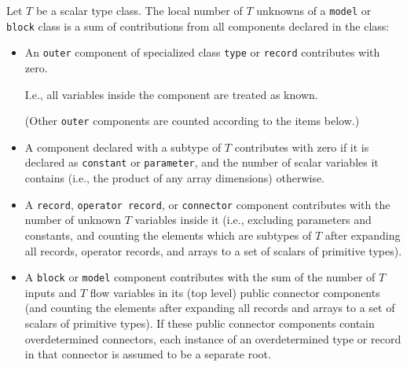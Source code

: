 \begin{definition}
Let $T$ be a scalar type class.
The local number of $T$ unknowns of a \lstinline!model! or \lstinline!block! class is a sum of contributions from all components declared in the class:
\begin{itemize}
\item
  An \lstinline!outer! component of specialized class \lstinline!type! or \lstinline!record! contributes with zero.
  \begin{nonnormative}
  I.e., all variables inside the component are treated as known.
  \end{nonnormative}
  (Other \lstinline!outer! components are counted according to the items below.)
\item
  A component declared with a subtype of $T$ contributes with zero if it is declared as \lstinline!constant! or \lstinline!parameter!, and the number of scalar variables it contains (i.e., the product of any array dimensions) otherwise.
\item
  A \lstinline!record!, \lstinline!operator record!, or \lstinline!connector! component contributes with the number of unknown $T$ variables inside it
  (i.e., excluding parameters and constants, and counting the elements which are subtypes of $T$ after expanding all records, operator records, and arrays to a set of scalars of primitive types).
\item
  A \lstinline!block! or \lstinline!model! component contributes with the sum of the number of $T$ inputs and $T$ flow variables in its (top level) public connector components (and counting the elements after expanding all records and arrays to a set of scalars of primitive types).
  If these public connector components contain overdetermined connectors, each instance of an overdetermined type or record in that connector is assumed to be a separate root.
\end{itemize}
\end{definition}

